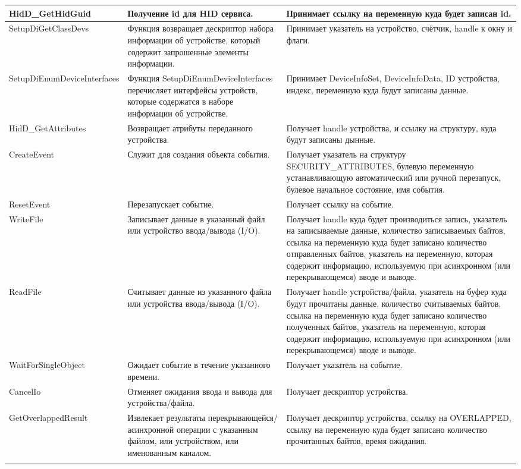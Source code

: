 \begin{tabularx}{\linewidth}{|X|X|X|}
        HidD\_GetHidGuid & Получение id для HID сервиса.
        & Принимает ссылку на переменную куда будет записан id. \\ \hline
        SetupDiGetClassDevs & Функция возвращает дескриптор набора информации об устройстве, который содержит запрошенные элементы информации.
        & Принимает указатель на устройство, счётчик, handle к окну и флаги. \\ \hline
        SetupDiEnumDeviceInterfaces & Функция SetupDiEnumDeviceInterfaces перечисляет интерфейсы устройств, которые содержатся в наборе информации об устройстве.
        & Принимает DeviceInfoSet, DeviceInfoData, ID устройства, индекс, переменную куда будут записаны данные. \\ \hline
        HidD\_GetAttributes & Возвращает атрибуты переданного устройства.
        & Получает handle устройства, и ссылку на структуру, куда будут записаны дынные. \\ \hline
        CreateEvent & Служит для создания объекта события.
        & Получает указатель на структуру SECURITY\_ATTRIBUTES, булевую переменную устанавливающую автоматический или ручной перезапуск, булевое начальное состояние, имя события. \\ \hline
        ResetEvent & Перезапускает событие.
        & Получает ссылку на событие. \\ \hline
        WriteFile & Записывает данные в указанный файл или устройство ввода/вывода (I/O).
        & Получает handle куда будет производиться запись, указатель на записываемые данные, количество записываемых байтов, ссылка на переменную куда будет записано количество отправленных байтов, указатель на переменную, которая содержит информацию, используемую при асинхронном (или перекрывающемся) вводе и выводе. \\ \hline
        ReadFile & Считывает данные из указанного файла или устройства ввода/вывода (I/O).
        & Получает handle устройства/файла, указатель на буфер куда будут прочитаны данные, количество считываемых байтов, ссылка на переменную куда будет записано количество полученных байтов, указатель на переменную, которая содержит информацию, используемую при асинхронном (или перекрывающемся) вводе и выводе. \\ \hline
        WaitForSingleObject & Ожидает событие в течение указанного времени.
        & Получает указатель на событие. \\ \hline
        CancelIo & Отменяет ожидания ввода и вывода для устройства/файла.
        & Получает дескриптор устройства. \\ \hline
        GetOverlappedResult & Извлекает результаты перекрывающейся/асинхронной операции с указанным файлом, или устройством, или именованным каналом.
        & Получает дескриптор устройства, ссылку на OVERLAPPED, ссылку на переменную куда будет записано количество прочитанных байтов, время ожидания. \\ \hline
        \caption{\label{tab:table} Таблица с описанием стандартных использованных функций}
\end{tabularx}
